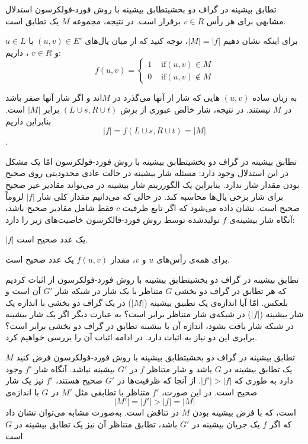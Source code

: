 \begin{itemframe-s}{تطابق بیشینه در گراف دو بخشی}{تطابق بیشینه با روش فورد-فولکرسون}
\itm
استدلال مشابهی برای هر رأس $v \in R$ برقرار است. در نتیجه، مجموعه $M$ یک تطابق است.

\itm
برای اینکه نشان دهیم $|M| = |f|$، توجه کنید که از میان یال‌های
$(u, v) \in E'$
 با
$u \in L$
 و
$v \in R$
، داریم:
$$
f(u,v) =
\begin{cases}
1 & \text{ if} (u,v) \in M \\
0 & \text{ if} (u,v) \notin M
\end{cases}
$$

به زبان ساده $(u,v)$ هایی که شار از آنها می‌گذرد در  $M$‌اند و اگر شار آنها صفر باشد در  $M$ نیستند.
\itm
در نتیجه، شار خالص عبوری از برش $(L \cup {s}, R \cup {t})$ برابر $|M|$ است.
بنابراین داریم
$$|f| = f(L \cup {s}, R \cup {t}) = |M|$$.
\end{itemframe-s}


\begin{itemframe-s}{تطابق بیشینه در گراف دو بخشی}{تطابق بیشینه با روش فورد-فولکرسون}
\itm
امّا یک مشکل در این استدلال وجود دارد:‌ مسئله شار بیشینه در حالت عادی محدودیتی روی صحیح بودن مقدار شار ندارد. بنابراین یک الگورریتم شار بیشینه در می‌تواند مقادیر غیر صحیح برای شار برخی یال‌ها محاسبه کند. در حالی که می‌دانیم مقدار کلی شار $|f|$ لزوماً صحیح است.
\itm
نشان داده می‌شود که اگر تابع ظرفیت $c$ فقط شامل مقادیر صحیح باشد، آنگاه شار بیشینه‌ی $f$ تولیدشده توسط روش فورد-فالکرسون خاصیت‌های زیر را دارد:
\item[1]
$|f|$
یک عدد صحیح است.
\item[2]
 برای همه‌ی رأس‌های $u$ و $v$، مقدار $f(u, v)$ یک عدد صحیح است.
\end{itemframe-s}


\begin{itemframe-s}{تطابق بیشینه در گراف دو بخشی}{تطابق بیشینه با روش فورد-فولکرسون}
\itm
از اثبات کردیم که هر تطابق در گراف دو بخشی $G$ متناظر با یک شار در شبکه شار $G'$ آن است و بلعکس.
\itm
امّا آیا اندازه‌ی یک تطبیق بیشینه ($|M|$) در یک گراف دو بخشی با اندازه یک شار بیشینه ($|f|$) در شبکه‌ی شار متناظر برابر است؟ به عبارت دیگر اگر یک شار بیشینه در شبکه شار یافت بشود، اندازه آن با بیشینه تطابق در گراف دو بخشی برابر است؟
\itm
برابری این دو نیاز به اثبات دارد. در ادامه اثبات آن را بررسی خواهیم کرد.
\end{itemframe-s}

\begin{itemframe-s}{تطابق بیشینه در گراف دو بخشی}{تطابق بیشینه با روش فورد-فولکرسون}
\itm
 فرض کنید $M$ یک تطابق بیشینه در $G$ باشد و شار متناظر $f$ در $G'$ بیشینه نباشد. آنگاه شار $f'$ وجود دارد به طوری که $|f'| > |f|$.
\itm
از آنجا که ظرفیت‌ها در $G'$ صحیح هستند، $f'$ نیز یک شار صحیح است.
در این صورت، $f'$ متناظر با تطابقی مثل $M'$ در $G$ با اندازه‌ی
$$|M'| = |f'| > |f| = |M|$$
است، که با فرض بیشینه بودن $M$ در تناقض است.
\itm
به‌صورت مشابه می‌توان نشان داد که اگر $f$ یک جریان بیشینه در $G'$ باشد، تطابق متناظر آن نیز یک تطابق بیشینه در $G$ است.
\end{itemframe-s}


